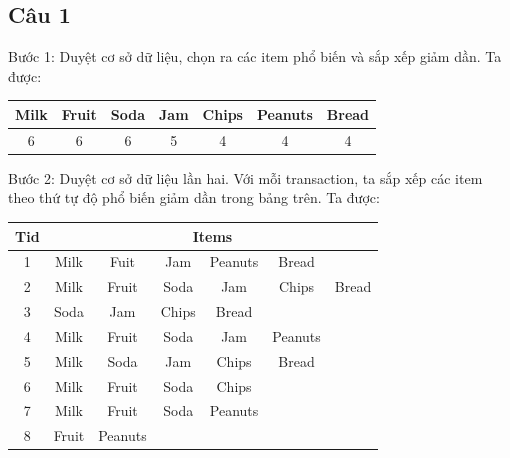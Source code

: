 \documentclass{article}
\begin{document}
\subsection{Câu 1}
\begin{flushleft}
Bước 1: Duyệt cơ sở dữ liệu, chọn ra các item phổ biến và sắp xếp giảm dần. Ta được:\\
\begin{center}
\begin{tabular}{|c|c|c|c|c|c|c|}
	\hline Milk & Fruit & Soda & Jam & Chips & Peanuts & Bread \\ 
	\hline 6 & 6 & 6 & 5 & 4 & 4 & 4 \\ 
	\hline 
\end{tabular} 
\end{center}
Bước 2: Duyệt cơ sở dữ liệu lần hai. Với mỗi transaction, ta sắp xếp các item theo thứ tự độ phổ biến giảm dần trong bảng trên. Ta được:\\
\begin{center}
\begin{tabular}{c|c c c c c c }
	Tid & \multicolumn{6}{c}{Items}  \\ 
	\hline 1 & Milk & Fuit & Jam & Peanuts & Bread &  \\ 
	2 & Milk & Fruit & Soda & Jam & Chips & Bread \\ 
	3 & Soda & Jam & Chips & Bread &  &  \\ 
	4 & Milk & Fruit & Soda & Jam & Peanuts &  \\ 
	5 & Milk & Soda & Jam & Chips & Bread &  \\ 
	6 & Milk & Fruit & Soda & Chips &  &  \\ 
	7 & Milk & Fruit & Soda & Peanuts &  &  \\ 
	8 & Fruit & Peanuts &  &  &  &  \\ 
\end{tabular} 
\end{center}




\end{flushleft}
\end{document}
